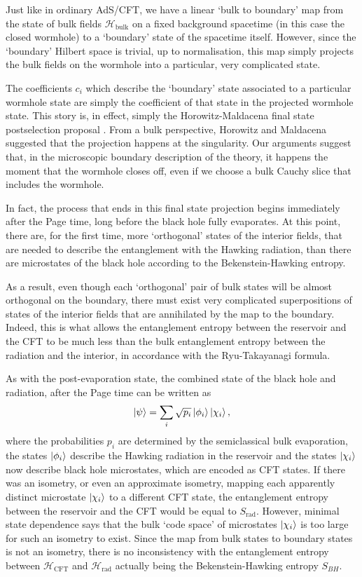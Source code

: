 \documentclass[12pt]{article}
\newcommand{\Srad}{S_\text{rad} }
\begin{document}
Just like in ordinary AdS/CFT, we have a linear `bulk to boundary' map from the state of bulk fields $\mathcal{H}_\text{bulk}$ on a fixed background spacetime (in this case the closed wormhole) to a `boundary' state of the spacetime itself. However, since the `boundary' Hilbert space is trivial, up to normalisation, this map simply projects the bulk fields on the wormhole into a particular, very complicated state. 

The coefficients $c_i$ which describe the `boundary' state associated to a particular wormhole state are simply the coefficient of that state in the projected wormhole state.
This story is, in effect, simply the Horowitz-Maldacena final state postselection proposal \cite{horowitz2004black}. From a bulk perspective, Horowitz and Maldacena suggested that the projection happens at the singularity. Our arguments suggest that, in the microscopic boundary description of the theory, it happens the moment that the wormhole closes off, even if we choose a bulk Cauchy slice that includes the wormhole. 

In fact, the process that ends in this final state projection begins immediately after the Page time, long before the black hole fully evaporates. At this point, there are, for the first time, more `orthogonal' states of the interior fields, that are needed to describe the entanglement with the Hawking radiation, than there are microstates of the black hole according to the Bekenstein-Hawking entropy. 

As a result, even though each `orthogonal' pair of bulk states will be almost orthogonal on the boundary, there must exist very complicated superpositions of states of the interior fields that are annihilated by the map to the boundary. Indeed, this is what allows the entanglement entropy between the reservoir and the CFT to be much less than the bulk entanglement entropy between the radiation and the interior, in accordance with the Ryu-Takayanagi formula.

As with the post-evaporation state, the combined state of the black hole and radiation, after the Page time can be written as
\begin{align}
\ket{\psi} = \sum_i \sqrt{p_i} \ket{\phi_i} \ket{\chi_i},
\end{align}
where the probabilities $p_i$ are determined by the semiclassical bulk evaporation, the states $\ket{\phi_i}$ describe the Hawking radiation in the reservoir and the states $\ket{\chi_i}$ now describe black hole microstates, which are encoded as CFT states. If there was an isometry, or even an approximate isometry, mapping each apparently distinct microstate $\ket{\chi_i}$ to a different CFT state, the entanglement entropy between the reservoir and the CFT would be equal to $\Srad$. However, minimal state dependence says that the bulk `code space' of microstates $\ket{\chi_i}$ is too large for such an isometry to exist. Since the map from bulk states to boundary states is not an isometry, there is no inconsistency with the entanglement entropy between $\mathcal{H}_\text{CFT}$ and $\mathcal{H}_\text{rad}$ actually being the Bekenstein-Hawking entropy $S_{BH}$.
\end{document}
